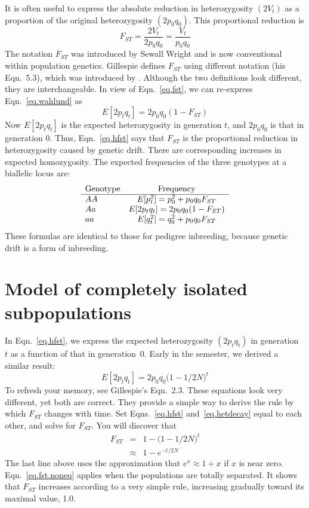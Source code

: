 \documentclass[twocolumn]{article}
\begin{document}
It is often useful to express the absolute reduction in heterozygosity
$(2V_t)$ as a proportion of the original heterozygosity $(2p_0q_0)$.
This proportional reduction is
\begin{equation}
F_{ST} = \frac{2V_t}{2p_0q_0} = \frac{V_t}{p_0q_0} 
\label{eq.fst}
\end{equation}
The notation $F_{ST}$ was introduced by Sewall Wright
\citep{Wright:AE-15-323} and is now conventional within population
genetics.  Gillespie defines $F_{ST}$ using different notation (his
Eqn.~5.3), which was introduced by \citet{Nei:PNA-70-3321}.  Although
the two definitions look different, they are interchangeable.  In view
of Eqn.~\ref{eq.fst}, we can re-express Eqn.~\ref{eq.wahlund} as
\begin{equation}
E[2p_t q_t] = 2p_0q_0(1-F_{ST})
\label{eq.hfst}
\end{equation}
Now $E[2p_t q_t]$ is the expected heterozygosity in generation $t$,
and $2p_0q_0$ is that in generation 0. Thus, Eqn.~\ref{eq.hfst} says
that $F_{ST}$ is the proportional reduction in heterozygosity caused
by genetic drift. There are corresponding increases in expected
homozygosity. The expected frequencies of the three genotypes at a
biallelic locus are:
\[
\begin{array}{lc}
\hbox{Genotype} & \hbox{Frequency}\\
\hline
AA & E[p_t^2] = p_0^2 + p_0q_0F_{ST}\\
Aa & E[2p_t q_t] = 2p_0q_0(1-F_{ST})\\
aa & E[q_t^2] = q_0^2 + p_0q_0F_{ST}\\
\end{array}
\]
These formulas are identical to those for pedigree inbreeding, because
genetic drift is a form of inbreeding.

\section{Model of completely isolated subpopulations}
\label{sec.nomig}

In Eqn.~\ref{eq.hfst}, we express the expected heterozygosity
$(2p_tq_t)$ in generation~$t$ as a function of that in generation~0.
Early in the semester, we derived a similar result:
\begin{equation}
E[2p_t q_t] = 2p_0q_0\bigl(1-1/2N\bigr)^t
\label{eq.hetdecay}
\end{equation}
To refresh your memory, see Gillespie's Eqn.~2.3.  These equations
look very different, yet both are correct.  They provide a simple way
to derive the rule by which $F_{ST}$ changes with time.  Set
Eqns.~\ref{eq.hfst} and~\ref{eq.hetdecay} equal to each other, and
solve for $F_{ST}$.  You will discover that
\begin{eqnarray}
F_{ST} &=& 1 - \bigl(1-1/2N\bigr)^t\nonumber\\
  &\approx& 1 - e^{-t/2N}
\label{eq.fst.noneq}
\end{eqnarray}
The last line above uses the approximation that $e^x \approx 1+x$ if
$x$ is near zero.  Eqn.~\ref{eq.fst.noneq} applies when the
populations are totally separated.  It shows that $F_{ST}$ increases
according to a very simple rule, increasing gradually toward its
maximal value, 1.0.
\end{document}
